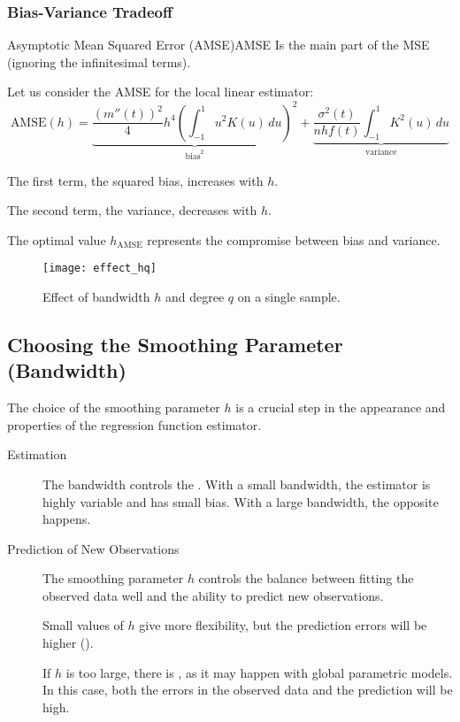\subsubsection{Bias-Variance Tradeoff}
\begin{definition}{Asymptotic Mean Squared Error (AMSE)}{AMSE}
	Is the main part of the MSE (ignoring the infinitesimal terms).
\end{definition}

Let us consider the AMSE for the local linear estimator:
\begin{equation*}
	\text{AMSE}(h) = \underbrace{\frac{(m''(t))^2}{4}h^4 \left( \int_{-1}^1 u^2 K(u)\, du \right)^2}_{\text{bias}^2}
	+
	\underbrace{\frac{\sigma^2(t)}{nhf(t)} \int_{-1}^1 K^2(u) \, du}_{\text{variance}}
\end{equation*}

The first term, the squared bias, increases with $h$.

The second term, the variance, decreases with $h$.

\begin{note}
	The optimal value $h_{\text{AMSE}}$ represents the compromise between bias and variance.
\end{note}

\begin{figure}[H]
	\texttt{[image: effect\_hq]}
	\caption{Effect of bandwidth $h$ and degree $q$ on a single sample.}
\end{figure}

\subsection{Choosing the Smoothing Parameter (Bandwidth)}
The choice of the smoothing parameter $h$ is a crucial step in the appearance
and properties of the regression function estimator.

\begin{description}
	\item[Estimation]
		The bandwidth controls the . With a small bandwidth,
		the estimator is highly variable and has small bias. With a large bandwidth, the
		opposite happens.
	\item[Prediction of New Observations] The smoothing parameter $h$ controls the
		balance between fitting the observed data well and the ability to predict
		new observations.

		Small values of $h$ give more flexibility, but the prediction errors
		will be higher ().

		If $h$ is too large, there is , as it may happen with
		global parametric models. In this case, both the errors in the observed data
		and the prediction will be high.
\end{description}

